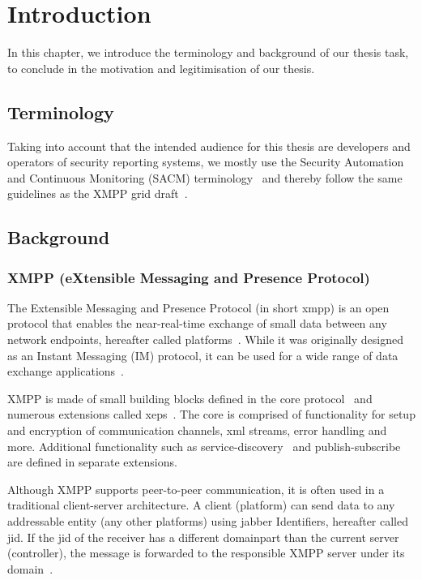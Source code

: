 \newcommand{\code}{\texttt}
\chapter{Introduction}
\label{sec:introduction}

In this chapter, we introduce the terminology and background of our thesis task, to conclude in the motivation and legitimisation of our thesis.

\section{Terminology}
Taking into account that the intended audience for this thesis are developers and operators of security reporting systems, 
we mostly use the  Security Automation and Continuous Monitoring (SACM) terminology~\cite{ietf-sacm-terminology-14}
and thereby follow the same guidelines as the XMPP grid draft~\cite{ietf-mile-xmpp-grid-05}.

\section{Background}

\subsection{XMPP (eXtensible Messaging and Presence Protocol)}
The Extensible Messaging and Presence Protocol (in short \gls{xmpp}) is an open protocol that enables the near-real-time exchange of small data between any network endpoints, hereafter called \glspl{platform}~\cite{rfc6120}.
While it was originally designed as an Instant Messaging (IM) protocol, it can be used for a wide range of data exchange applications~\cite{ieee-xplore-stream-xml-xmpp}.

XMPP is made of small building blocks defined in the core protocol~\cite{rfc6120} and numerous extensions called \glspl{xep}~\cite{xep-0001}.
The core is comprised of functionality for setup and encryption of communication channels, \gls{xml} streams, error handling and more. Additional functionality such as \gls{service-discovery}~\cite{xep-0030} and \gls{publish-subscribe}~\cite{xep-0060} are defined in separate extensions.

Although XMPP supports peer-to-peer communication, it is often used in a traditional client-server architecture.
A client (\gls{platform}) can send data to any addressable entity (any other \glspl{platform}) using \Gls{jabber} Identifiers, hereafter called \gls{jid}. If the \gls{jid} of the receiver has a different domainpart than the current server (\gls{controller}), the message is forwarded to the responsible XMPP server under its domain~\cite{rfc6120}.

